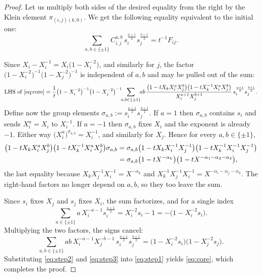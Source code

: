 \documentclass[10pt]{amsart}
\begin{document}
	\begin{proof}
		Let us multiply both sides of the desired equality from the right by the Klein element $\pi_{(i,j)(k,0)}$. We get the following equality equivalent to the initial one:
		\begin{equation}\label{eq:core}
			\sum_{a,b\in\{\pm1\}}C^{a,b}_{i,j}\,
			s_{i}^{\frac{a+1}{2}}s_{j}^{\frac{b+1}{2}}=t^{-1}F_{ij}.
		\end{equation}
		
		Since $X_{i}-X_{i}^{-1}=X_{i}\bigl(1-X_{i}^{-2}\bigr)$, and similarly for $j$, the factor $\bigl(1-X_{i}^{-2}\bigr)^{-1} \bigl(1-X_{j}^{-2}\bigr)^{-1}$ is independent of $a,b$ and may be pulled out of the sum:
		\begin{equation}\label{eq:step1}
			\text{LHS of }\eqref{eq:core}=\frac{1}{t}\bigl(1-X_{i}^{-2}\bigr)^{-1}\bigl(1-X_{j}^{-2}\bigr)^{-1}\!\!\sum_{a,b\in\{\pm1\}}\!\! ab\,\frac{\bigl(1-t X_{k}X_{i}^{a}X_{j}^{b}\bigr)\bigl(1-t X_{k}^{-1}X_{i}^{a}X_{j}^{b}\bigr)} {X_{i}^{a+1}X_{j}^{b+1}}\,s_{i}^{\frac{a+1}{2}}s_{j}^{\frac{b+1}{2}}.
		\end{equation}
		Define now the group elements $\sigma_{a,b}:=s_{i}^{\frac{a+1}{2}}s_{j}^{\frac{b+1}{2}}$. If $a=1$ then $\sigma_{a,b}$ contains $s_{i}$ and sends $X_{i}^{a}=X_{i}$ to $X_{i}^{-1}$. If $a=-1$ then $\sigma_{a,b}$ fixes $X_{i}$ and the exponent is already $-1$. Either way $\bigl(X_{i}^{a}\bigr)^{\sigma_{a,b}}=X_{i}^{-1}$, and similarly for $X_{j}$. Hence for every $a,b\in\{\pm1\}$,
		\begin{align}
			\bigl(1-t X_{k}X_{i}^{a}X_{j}^{b}\bigr)
			\bigl(1-t X_{k}^{-1}X_{i}^{a}X_{j}^{b}\bigr)\sigma_{a,b}
			&=\sigma_{a,b}\bigl(1-t X_{k}X_{i}^{-1}X_{j}^{-1}\bigr)
			\bigl(1-t X_{k}^{-1}X_{i}^{-1}X_{j}^{-1}\bigr)
			\notag\\
			&=\sigma_{a,b}\bigl(1-t X^{-\alpha_k}\bigr)
			\bigl(1-t X^{-\alpha_1-\alpha_2-\alpha_3}\bigr),
			\label{eq:step2}
		\end{align}
		the last equality because
		$X_{k}X_{j}^{-1}X_{i}^{-1}=X^{-\alpha_k}$ and
		$X_{k}^{-1}X_{j}^{-1}X_{i}^{-1}=X^{-\alpha_i-\alpha_j-\alpha_k}$.
		The right-hand factors no longer depend on $a,b$, so they too leave the sum.
		
		Since $s_{i}$ fixes $X_{j}$ and $s_{j}$ fixes $X_{i}$, the sum
		factorizes, and for a single index
		\begin{equation}
			\sum_{a\in\{\pm1\}}a\,X_{i}^{-a-1}s_{i}^{\frac{a+1}{2}}
			=X_{i}^{-2}s_{i}-1=-\bigl(1-X_{i}^{-2}s_{i}\bigr).
		\end{equation}
		Multiplying the two factors, the signs cancel:
		\begin{equation}\label{eq:step3}
			\sum_{a,b\in\{\pm1\}}ab\,X_{i}^{-a-1}X_{j}^{-b-1}\,
			s_{i}^{\frac{a+1}{2}}s_{j}^{\frac{b+1}{2}}
			=\bigl(1-X_{i}^{-2}s_{i}\bigr)\bigl(1-X_{j}^{-2}s_{j}\bigr).
		\end{equation}
		Substituting \eqref{eq:step2} and \eqref{eq:step3} into \eqref{eq:step1}
		yields \eqref{eq:core}, which completes the proof.
	\end{proof}
	
\end{document}
